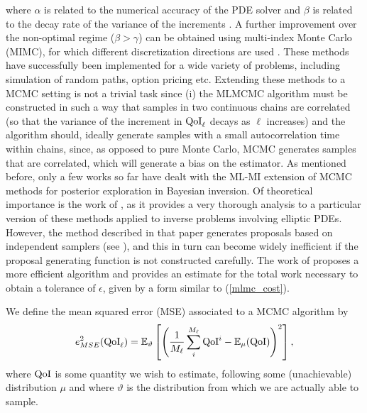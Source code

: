 where $\alpha$ is related to the numerical accuracy of the PDE solver and $\beta$ is related to the decay rate of the variance of the increments \cite{giles2008multilevel}. A further improvement over the non-optimal regime ($\beta>\gamma$) can be obtained using  multi-index Monte Carlo (MIMC), for which different discretization directions are used \cite{haji2016multi}. These methods have successfully been implemented for a wide variety of problems, including simulation of random paths, option pricing etc. Extending these methods to a MCMC setting is not a trivial task since (i) the MLMCMC algorithm must be constructed in such a way that  samples in two continuous chains are correlated (so that the variance of the increment in $\text{QoI}_\ell$ decays as $\ell$ increases) and the algorithm should, ideally generate samples with a small autocorrelation time within chains, since, as opposed to pure Monte Carlo, MCMC generates samples that are correlated, which will generate a bias on the estimator.  As mentioned before,  only a few works so far have dealt with the ML-MI extension of MCMC methods for posterior exploration in Bayesian inversion. Of theoretical importance is the work of \cite{hoang2013complexity}, as it provides a very thorough analysis to a particular version of these methods applied to inverse problems involving elliptic PDEs. However, the method described in that paper generates proposals based on independent samplers (see \cite{asmussen2007stochastic}), and this in turn can become widely inefficient if the proposal generating function is not constructed carefully. The work of \cite{dodwell2015hierarchical} proposes a more efficient algorithm and provides an estimate for the total work necessary to obtain a tolerance of $\epsilon$, given by a form similar to (\ref{mlmc_cost}). \begin{definition}
	We define the mean squared error (MSE) associated to a MCMC algorithm by $$e^2_{MSE}(\text{QoI}_{\ell})=\mathbb{E}_\vartheta\left[ \left(\frac{1}{M_\ell}\sum_i^{M_\ell}\text{QoI}^i-\mathbb{E}_\mu(\text{QoI})\right)^2	\right], $$
	where $\text{QoI}$ is some quantity we wish to estimate, following some (unachievable) distribution $\mu$ and where $\vartheta$ is the distribution from which we are actually able to sample.  \end{definition} 

